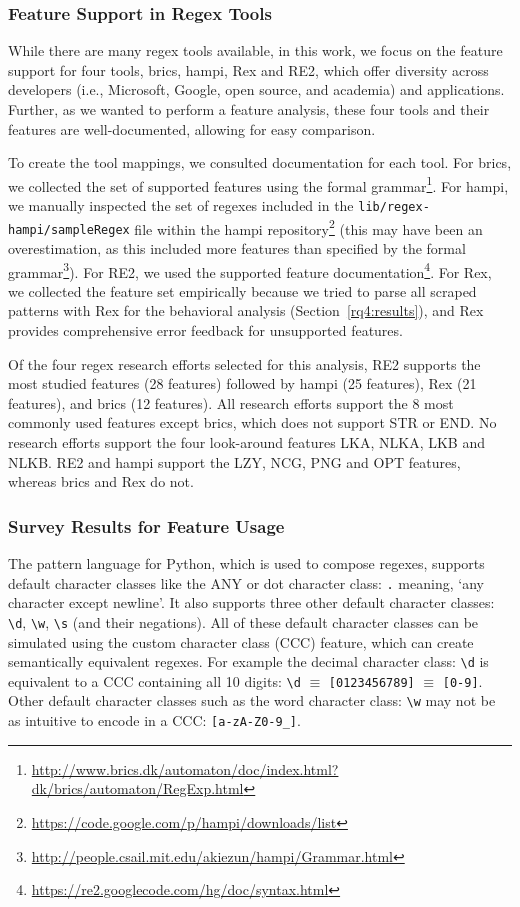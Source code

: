 \subsubsection{Feature Support in Regex Tools}
\label{regextoolsresults}
While there are many regex tools available, in this work, we focus on the feature support for  four tools, brics, hampi, Rex and RE2, which offer diversity across developers (i.e., Microsoft, Google, open source, and academia) and applications. Further, as we wanted to perform a feature analysis, these four tools and their features are well-documented, allowing for easy comparison.

To create the tool mappings, we consulted documentation for each tool. For brics, we collected the set of supported features using the formal grammar\footnote{\url{http://www.brics.dk/automaton/doc/index.html?dk/brics/automaton/RegExp.html}}.  For hampi, we manually inspected the set of regexes included in the {\tt lib/regex-hampi/sampleRegex} file within the hampi repository\footnote{\url{https://code.google.com/p/hampi/downloads/list}} (this may have been an overestimation, as this included more features than specified by the formal grammar\footnote{\url{http://people.csail.mit.edu/akiezun/hampi/Grammar.html}}).  For RE2, we used the  supported feature documentation\footnote{\url{https://re2.googlecode.com/hg/doc/syntax.html}}.  For Rex, we collected the feature set empirically because we tried to parse all scraped patterns with Rex for the behavioral analysis (Section~\ref{rq4:results}), and Rex provides comprehensive error feedback for unsupported features.

Of the four regex research efforts selected for this analysis, RE2 supports the most studied features (28 features) followed by hampi (25 features),  Rex (21 features), and brics (12 features).  All research efforts support the 8 most commonly used features except brics, which does not support STR or END.
No research efforts support the four look-around features LKA, NLKA, LKB and NLKB.  RE2 and hampi support the LZY, NCG, PNG and OPT features, whereas brics and Rex do not.

\subsubsection{Survey Results for Feature Usage}
The pattern language for Python, which is used to compose regexes, supports default character classes like the ANY or dot character class: \verb!.! meaning, `any character except newline'.
It also supports three other default character classes: \verb!\d!, \verb!\w!, \verb!\s! (and their negations). All of these default character classes can be simulated using the custom character class (CCC) feature, which can create semantically equivalent regexes.
For example  the decimal character class: \verb!\d! is equivalent to a CCC containing all 10 digits:  \verb!\d! $\equiv$ \verb![0123456789]! $\equiv$ \verb![0-9]!.
Other default character classes such as the word character class: \verb!\w! may not be as intuitive to encode in a CCC: \verb![a-zA-Z0-9_]!.

